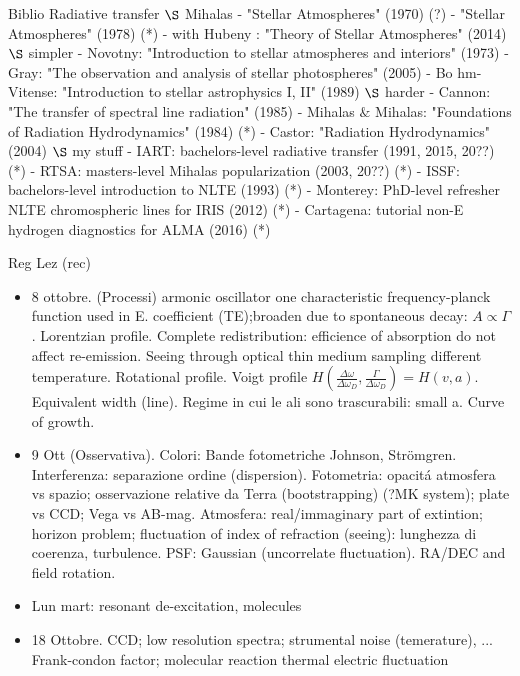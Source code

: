 \begin{frame}{Biblio Radiative transfer}
$\S$ Mihalas
- "Stellar Atmospheres" (1970) (?)
- "Stellar Atmospheres" (1978) (*)
- with Hubeny : "Theory of Stellar Atmospheres" (2014)
$\S$ simpler
- Novotny: "Introduction to stellar atmospheres and interiors" (1973)
- Gray: "The observation and analysis of stellar photospheres" (2005) - Bo hm-Vitense: "Introduction to stellar astrophysics I, II" (1989)
$\S$ harder
- Cannon: "The transfer of spectral line radiation" (1985)
- Mihalas $\&$ Mihalas: "Foundations of Radiation Hydrodynamics" (1984) (*) - Castor: "Radiation Hydrodynamics" (2004)
$\S$ my stuff
- IART: bachelors-level radiative transfer (1991, 2015, 20??) (*)
- RTSA: masters-level Mihalas popularization (2003, 20??) (*)
- ISSF: bachelors-level introduction to NLTE (1993) (*)
- Monterey: PhD-level refresher NLTE chromospheric lines for IRIS (2012) (*) - Cartagena: tutorial non-E hydrogen diagnostics for ALMA (2016) (*)
\end{frame}

\begin{frame}[allowframebreaks]{Reg Lez (rec)}
\begin{itemize}
\item 8 ottobre. (Processi) armonic oscillator one characteristic frequency-planck function used in E. coefficient  (TE);broaden due to spontaneous decay: $A\propto\Gamma$. Lorentzian profile. Complete redistribution: efficience of absorption do not affect re-emission.
Seeing through optical thin medium sampling different temperature. Rotational profile. Voigt profile $H(\frac{\Delta\omega}{\Delta\omega_D},\frac{\Gamma}{\Delta\omega_D})=H(v,a)$. Equivalent width (line). Regime in cui le ali sono trascurabili: small a. Curve of growth.
\item 9 Ott (Osservativa). Colori: Bande fotometriche Johnson, Str\"omgren. Interferenza: separazione ordine (dispersion). Fotometria: opacit\'a atmosfera vs spazio; osservazione relative da Terra (bootstrapping) (?MK system); plate vs CCD; Vega vs AB-mag. Atmosfera: real/immaginary part of extintion; horizon problem; fluctuation of index of refraction (seeing): lunghezza di coerenza, turbulence. PSF: Gaussian (uncorrelate fluctuation). RA/DEC and field rotation.

\item Lun mart: resonant de-excitation, molecules

\item 18 Ottobre. CCD; low resolution spectra; strumental noise (temerature), ...
Frank-condon factor; molecular reaction
thermal electric fluctuation
\end{itemize}

\end{frame}